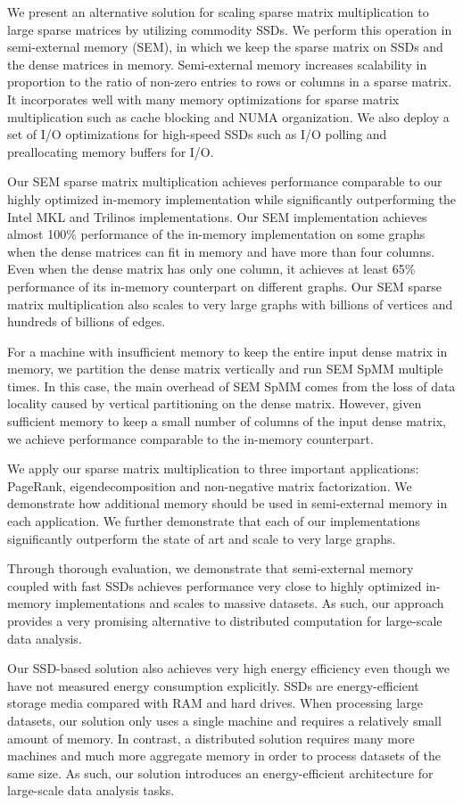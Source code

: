We present an alternative solution for scaling sparse matrix multiplication
to large sparse matrices by utilizing commodity SSDs. We perform this operation
in semi-external memory (SEM), in which
we keep the sparse matrix on SSDs and the dense matrices in memory. Semi-external
memory increases scalability in proportion to the ratio of non-zero entries
to rows or columns in a sparse matrix. It incorporates well with many memory
optimizations for sparse matrix multiplication such as cache blocking and NUMA
organization. We also deploy a set of I/O optimizations for high-speed SSDs
such as I/O polling and preallocating memory buffers for I/O.

Our SEM sparse matrix multiplication achieves performance comparable
to our highly optimized in-memory implementation while significantly outperforming
the Intel MKL and
Trilinos implementations. Our SEM implementation achieves almost 100\% performance
of the in-memory implementation on some graphs when the dense matrices can fit
in memory and have more than four columns. Even when the dense matrix has only
one column, it achieves at least 65\% performance of its in-memory counterpart
on different graphs. Our SEM sparse matrix multiplication also scales to very
large graphs with billions of vertices and hundreds of billions of edges.

For a machine with insufficient memory to keep the entire input dense matrix
in memory, we partition the dense matrix vertically and run SEM SpMM multiple
times. In this case, the main overhead of SEM SpMM comes from the loss of
data locality caused by vertical partitioning on the dense matrix. However,
given sufficient memory to keep a small number of columns of the input dense
matrix, we achieve performance comparable to the in-memory counterpart.

We apply our sparse matrix multiplication to three important applications:
PageRank, eigendecomposition and non-negative matrix factorization. We demonstrate
how additional memory should be used in semi-external memory in each application.
We further demonstrate that each of our implementations significantly outperform
the state of art and scale to very large graphs.

Through thorough evaluation, we demonstrate that semi-external memory
coupled with fast SSDs achieves performance very close to highly optimized
in-memory implementations and scales to massive datasets.
As such, our approach provides a very promising alternative to distributed
computation for large-scale data analysis.

Our SSD-based solution also achieves very high energy efficiency even though
we have not measured energy consumption explicitly. SSDs are energy-efficient
storage media \cite{Tsirogiannis} compared with RAM and hard drives.
When processing large datasets, our solution only uses
a single machine and requires a relatively small amount of memory. In contrast,
a distributed solution requires many more machines and much more aggregate
memory in order to process datasets of the same size. As such, our solution
introduces an energy-efficient architecture for large-scale data analysis tasks.
